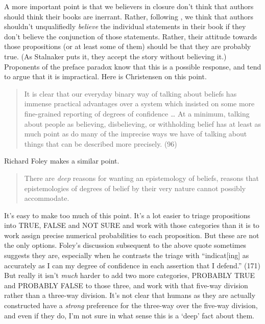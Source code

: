 A more important point is that we believers in closure don't think that authors should think their books are inerrant. Rather, following \citet{Stalnaker1984}, we think that authors shouldn't unqualifiedly \textit{believe} the individual statements in their book if they don't believe the conjunction of those statements. Rather, their attitude towards those propositions (or at least some of them) should be that they are probably true. (As Stalnaker puts it, they accept the story without believing it.) Proponents of the preface paradox know that this is a possible response, and tend to argue that it is impractical. Here is Christensen on this point.

\begin{quote}
It is clear that our everyday binary way of talking about beliefs has immense practical advantages over a system which insisted on some more fine-grained reporting of degrees of confidence {\dots} At a minimum, talking about people as believing, disbelieving, or withholding belief has at least as much point as do many of the imprecise ways we have of talking about things that can be described more precisely. (96)
\end{quote}

\noindent Richard Foley makes a similar point.

\begin{quote}
There are \textit{deep} reasons for wanting an epistemology of beliefs, reasons that epistemologies of degrees of belief by their very nature cannot possibly accommodate. \citep[170, my emphasis]{Foley1993}
\end{quote}

It's easy to make too much of this point. It's a lot easier to triage propositions into TRUE, FALSE and NOT SURE and work with those categories than it is to work assign precise numerical probabilities to each proposition. But these are not the only options. Foley's discussion subsequent to the above quote sometimes suggests they are, especially when he contrasts the triage with ``indicat[ing] as accurately as I can my degree of confidence in each assertion that I defend.'' (171) But really it isn't \textit{much} harder to add two more categories, PROBABLY TRUE and PROBABLY FALSE to those three, and work with that five-way division rather than a three-way division. It's not clear that humans as they are actually constructed have a \textit{strong} preference for the three-way over the five-way division, and even if they do, I'm not sure in what sense this is a `deep' fact about them.

